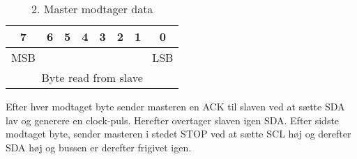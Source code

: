 \begin{table}[H]
\caption{2. Master modtager data}
\centering
\begin{tabular}{|c|c|c|c|c|c|c|c|}
\hline 
\textbf{7} & \textbf{6} & \textbf{5} & \textbf{4} & \textbf{3} & \textbf{2} & \textbf{1} & \textbf{0}\\ 
\hline 
MSB & & & & & & & LSB \\ 
\hline
\multicolumn{8}{|c|}{Byte read from slave} \\
\hline
\end{tabular}
\label{tabel:I2CMasterCommando}
\end{table} 

Efter hver modtaget byte sender masteren en ACK til slaven ved at sætte SDA lav og generere en clock-puls. Herefter overtager slaven igen SDA.
Efter sidste modtaget byte, sender masteren i stedet STOP ved at sætte SCL høj og derefter SDA høj og bussen er derefter frigivet igen.